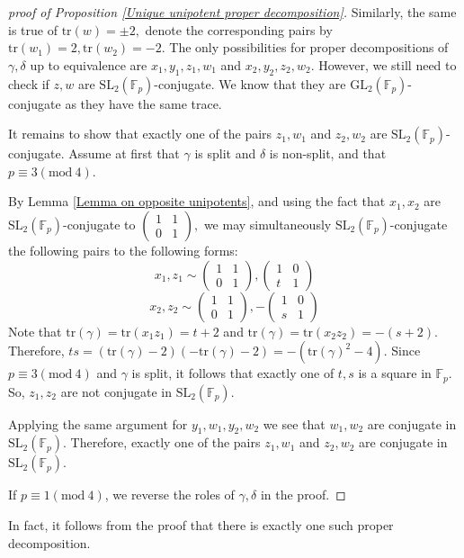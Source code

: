 \documentclass[letterpaper]{amsart}
\begin{document}
\begin{proof}[proof of Proposition \ref{Unique unipotent proper decomposition}]
Similarly, the same is true of $\mathrm{tr}(w) = \pm 2,$ denote the corresponding pairs by $\mathrm{tr}(w_1) = 2, \mathrm{tr}(w_2) = -2.$ The only possibilities for proper decompositions of $\gamma,\delta$ up to equivalence are $x_1, y_1, z_1, w_1$ and $x_2, y_2, z_2, w_2$. However, we still need to check if $z, w$ are $\mathrm{SL}_2(\mathbb{F}_p)$-conjugate. We know that they are $\mathrm{GL}_2(\mathbb{F}_p)$-conjugate as they have the same trace.

It remains to show that exactly one of the pairs $z_1, w_1$ and $z_2, w_2$ are $\mathrm{SL}_2(\mathbb{F}_p)$-conjugate.
Assume at first that $\gamma$ is split and $\delta$ is non-split, and that $p \equiv 3 (\mathrm{mod}\ 4)$.

By Lemma \ref{Lemma on opposite unipotents}, and using the fact that $x_1, x_2$ are $\mathrm{SL}_2(\mathbb{F}_p)$-conjugate to $\begin{pmatrix}1 & 1 \\ 0 & 1\end{pmatrix},$ we may simultaneously $\mathrm{SL}_2(\mathbb{F}_p)$-conjugate the following pairs to the following forms:
$$x_1, z_1 \sim \begin{pmatrix} 1 & 1 \\ 0 & 1\end{pmatrix}, \begin{pmatrix} 1 & 0 \\ t & 1\end{pmatrix}$$
$$x_2, z_2 \sim \begin{pmatrix} 1 & 1 \\ 0 & 1\end{pmatrix}, -\begin{pmatrix} 1 & 0 \\ s & 1\end{pmatrix}$$
Note that $\mathrm{tr}(\gamma) = \mathrm{tr}(x_1z_1) = t + 2$ and $\mathrm{tr}(\gamma) = \mathrm{tr}(x_2z_2) = -(s + 2)$. Therefore, $ts = (\mathrm{tr}(\gamma) - 2)(-\mathrm{tr}(\gamma) - 2) = -(\mathrm{tr}(\gamma)^2 - 4)$. Since $p \equiv 3(\mathrm{mod}\ 4)$ and $\gamma$ is split, it follows that exactly one of $t,s$ is a square in $\mathbb{F}_p.$ So, $z_1, z_2$ are not conjugate in $\mathrm{SL}_2(\mathbb{F}_p).$

Applying the same argument for $y_1, w_1, y_2, w_2$ we see that $w_1, w_2$ are conjugate in $\mathrm{SL}_2(\mathbb{F}_p)$. Therefore, exactly one of the pairs $z_1, w_1$ and $z_2, w_2$ are conjugate in $\mathrm{SL}_2(\mathbb{F}_p).$

If $p \equiv 1(\mathrm{mod}\ 4)$, we reverse the roles of $\gamma,\delta$ in the proof.
\end{proof}
In fact, it follows from the proof that there is exactly one such proper decomposition.
\end{document}

